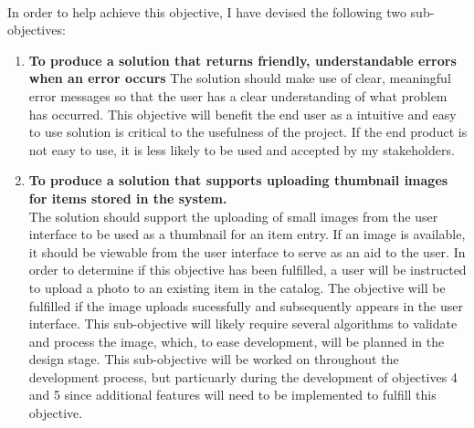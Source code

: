 \documentclass[../../../main.tex]{subfiles}
\begin{document}
\begin{enumerate}
            \noindent \\ In order to help achieve this objective, I have devised the following two sub-objectives:

            \begin{enumerate}

                  \item \textbf{To produce a solution that returns friendly, understandable errors when an error occurs}
                        The solution should make use of clear, meaningful error messages so that the user
                        has a clear understanding of what problem has occurred. This objective will benefit
                        the end user as a intuitive and easy to use solution is critical to the usefulness
                        of the project. If the end product is not easy to use, it is less likely to be used
                        and accepted by my stakeholders.

                  \item \textbf{To produce a solution that supports uploading thumbnail images for items stored in the system.}\\
                        The solution should support the uploading of small images from the user interface to be used as a thumbnail for an item entry.
                        If an image is available, it should be viewable from the user interface to serve as an aid to the user.
                        In order to determine if this objective has been fulfilled, a user will be instructed to upload a photo to an existing item in the catalog.
                        The objective will be fulfilled if the image uploads sucessfully and subsequently appears in the user interface.
                        This sub-objective will likely require several algorithms to validate and process the image, which, to ease development, will be planned in the design stage.
                        This sub-objective will be worked on throughout the development process, but particuarly during the development
                        of objectives 4 and 5 since additional features will need to be implemented to fulfill this objective.

            \end{enumerate}


\end{enumerate}
\end{document}

